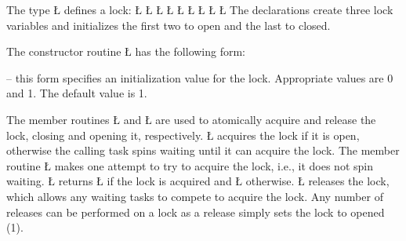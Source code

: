 \documentclass[openright,twoside]{report}
\begin{document}
The type \LGinlinetrue\LGbegin\lgrinde\L{}\endlgrinde\LGend{} defines a lock:
\LGinlinefalse\LGbegin\lgrinde
\L{}
\L{}
\L{\LB{}}
\L{\LB{}}
\L{\LB{}}
\L{\LB{}}
\L{\LB{\};}}
\L{}
\L{}
\endlgrinde\LGend
{}%
%
%
The declarations create three lock variables and initializes the first two to open and the last to closed.

The constructor routine \LGinlinetrue\LGbegin\lgrinde\L{}\endlgrinde\LGend{} has the following form:
\begin{prefix}
\item[\LGinlinetrue\LGbegin\lgrinde\L{\LB{\V{uLock}(\0\K{int}\0\V{value}\0)}}\endlgrinde\LGend{}]
-- this form specifies an initialization value for the lock.
Appropriate values are 0 and 1.
The default value is 1.
\end{prefix}

The member routines \LGinlinetrue\LGbegin\lgrinde\L{}\endlgrinde\LGend{} and \LGinlinetrue\LGbegin\lgrinde\L{}\endlgrinde\LGend{} are used to atomically acquire and release the lock, closing and opening it, respectively.
\LGinlinetrue\LGbegin\lgrinde\L{}\endlgrinde\LGend{} acquires the lock if it is open, otherwise the calling task spins waiting until it can acquire the lock.
The member routine \LGinlinetrue\LGbegin\lgrinde\L{}\endlgrinde\LGend{} makes one attempt to try to acquire the lock, i.e., it does not spin waiting.
\LGinlinetrue\LGbegin\lgrinde\L{}\endlgrinde\LGend{} returns \LGinlinetrue\LGbegin\lgrinde\L{}\endlgrinde\LGend{} if the lock is acquired and \LGinlinetrue\LGbegin\lgrinde\L{}\endlgrinde\LGend{} otherwise.
\LGinlinetrue\LGbegin\lgrinde\L{}\endlgrinde\LGend{} releases the lock, which allows any waiting tasks to compete to acquire the lock.
Any number of releases can be performed on a lock as a release simply sets the lock to opened (1).
\end{document}
